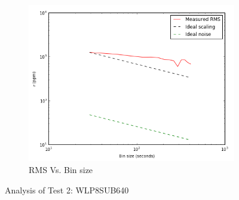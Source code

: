 \documentclass{aastex6}
\begin{document}
\begin{figure}[H]
    \begin{subfigure}{3}
        \includegraphics[scale=0.6]{rms_test2}
        \caption{RMS Vs. Bin size}
    \end{subfigure}
    \caption{Analysis of Test 2: WLP8SUB640}
\end{figure}
\end{document}
